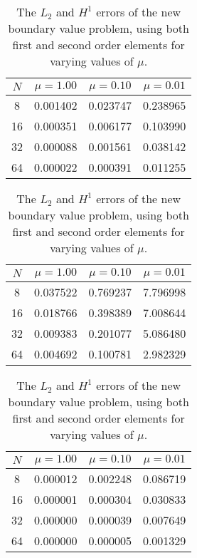 \documentclass[]{article}
\begin{document}
\begin{table}[htpb]
    \centering
    \caption{The $L_2$ and $H^1$ errors of the new boundary value problem,
    using both first and second order elements for varying values of $\mu$.}
    \label{tbl:errors_no_supg}
    
    \begin{tabular}{cccc}
        \toprule
        {$N$} &         $\mu = 1.00$ &         $\mu = 0.10$ &       $\mu=0.01$ \\
        \midrule
        8  &  0.001402 &  0.023747 &  0.238965 \\
        16 &  0.000351 &  0.006177 &  0.103990 \\
        32 &  0.000088 &  0.001561 &  0.038142 \\
        64 &  0.000022 &  0.000391 &  0.011255 \\
        \bottomrule
    \end{tabular}\vspace{2em}

    \begin{tabular}{cccc}
        \toprule
        {$N$} &         $\mu = 1.00$ &         $\mu = 0.10$ &       $\mu=0.01$ \\
        \midrule
        8  &  0.037522 &  0.769237 &  7.796998 \\
        16 &  0.018766 &  0.398389 &  7.008644 \\
        32 &  0.009383 &  0.201077 &  5.086480 \\
        64 &  0.004692 &  0.100781 &  2.982329 \\
        \bottomrule
    \end{tabular}\vspace{2em}

    \begin{tabular}{cccc}
        \toprule
        {$N$} &         $\mu = 1.00$ &         $\mu = 0.10$ &       $\mu=0.01$ \\
        \midrule
        8  &  0.000012 &  0.002248 &  0.086719 \\
        16 &  0.000001 &  0.000304 &  0.030833 \\
        32 &  0.000000 &  0.000039 &  0.007649 \\
        64 &  0.000000 &  0.000005 &  0.001329 \\
        \bottomrule
    \end{tabular}\vspace{2em}


\end{table}
\end{document}
